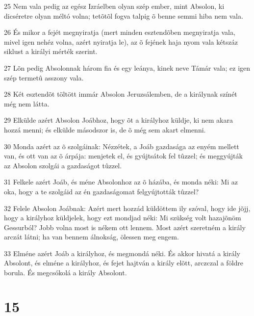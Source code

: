 \par 25 Nem vala pedig az egész Izráelben olyan szép ember, mint Absolon, ki dicséretre olyan méltó volna; tetõtõl fogva talpig õ benne semmi hiba nem vala.
\par 26 És mikor a fejét megnyiratja (mert minden esztendõben megnyiratja vala, mivel igen nehéz volna, azért nyiratja le), az õ fejének haja nyom vala kétszáz siklust a királyi mérték szerint.
\par 27 Lõn pedig Absolonnak három fia és egy leánya, kinek neve Támár vala; ez igen szép termetû asszony vala.
\par 28 Két esztendõt töltött immár Absolon Jeruzsálemben, de a királynak színét még nem látta.
\par 29 Elkülde azért Absolon Joábhoz, hogy õt a királyhoz küldje, ki nem akara hozzá menni; és elkülde másodszor is, de õ még sem akart elmenni.
\par 30 Monda azért az õ szolgáinak: Nézzétek, a Joáb gazdasága az enyém mellett van, és ott van az õ árpája: menjetek el, és gyújtsátok fel tûzzel; és meggyújták az Absolon szolgái a gazdaságot tûzzel.
\par 31 Felkele azért Joáb, és méne Absolonhoz az õ házába, és monda néki: Mi az oka, hogy a te szolgáid az én gazdaságomat felgyújtották tûzzel?
\par 32 Felele Absolon Joábnak: Azért mert hozzád küldöttem ily szóval, hogy ide jõjj, hogy a királyhoz küldjelek, hogy ezt mondjad néki: Mi szükség volt hazajõnöm Gessurból? Jobb volna most is nékem ott lennem. Most azért szeretném a király arczát látni; ha van bennem álnokság, ölessen meg engem.
\par 33 Elméne azért Joáb a királyhoz, és megmondá néki. És akkor hivatá a király Absolont, és elméne a királyhoz, és fejet hajtván a király elõtt, arczczal a földre borula. És megcsókolá a király Absolont.

\chapter{15}

